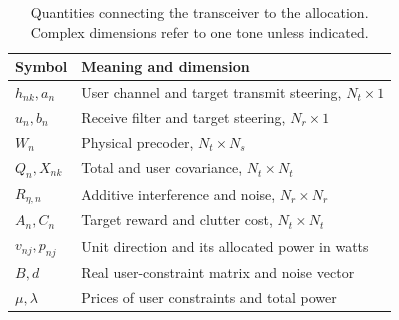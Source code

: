 \documentclass[journal]{IEEEtran}
\begin{document}
\begin{table}[t]\centering\footnotesize
\caption{Quantities connecting the transceiver to the allocation. Complex dimensions refer to one tone unless indicated.}
\begin{tabular}{@{}ll@{}}\toprule
Symbol & Meaning and dimension\\\midrule
$h_{nk},a_n$ & User channel and target transmit steering, $N_t\times1$\\
$u_n,b_n$ & Receive filter and target steering, $N_r\times1$\\
$W_n$ & Physical precoder, $N_t\times N_s$\\
$Q_n,X_{nk}$ & Total and user covariance, $N_t\times N_t$\\
$R_{\eta,n}$ & Additive interference and noise, $N_r\times N_r$\\
$A_n,C_n$ & Target reward and clutter cost, $N_t\times N_t$\\
$v_{nj},p_{nj}$ & Unit direction and its allocated power in watts\\
$B,d$ & Real user-constraint matrix and noise vector\\
$\mu,\lambda$ & Prices of user constraints and total power\\\bottomrule
\end{tabular}\end{table}
\end{document}
